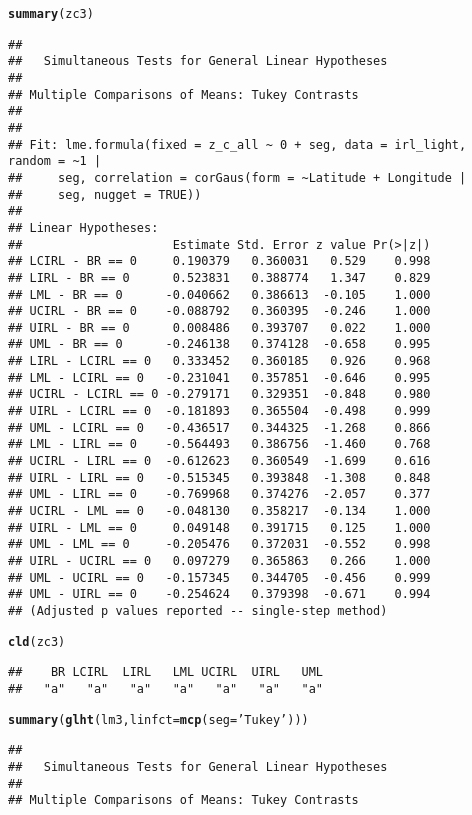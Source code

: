 \documentclass[letterpaper,12pt]{article}\usepackage[]{graphicx}\usepackage[]{color}
\makeatletter
\newcommand{\hlstr}[1]{\textcolor[rgb]{0.192,0.494,0.8}{#1}}%
\newcommand{\hlstd}[1]{\textcolor[rgb]{0.345,0.345,0.345}{#1}}%
\newcommand{\hlkwc}[1]{\textcolor[rgb]{0.333,0.667,0.333}{#1}}%
\newcommand{\hlkwd}[1]{\textcolor[rgb]{0.737,0.353,0.396}{\textbf{#1}}}%
\newenvironment{kframe}{%
 \def\at@end@of@kframe{}%
 \ifinner\ifhmode%
  \def\at@end@of@kframe{\end{minipage}}%
  \begin{minipage}{\columnwidth}%
 \fi\fi%
 \def\FrameCommand##1{\hskip\@totalleftmargin \hskip-\fboxsep
 \colorbox{shadecolor}{##1}\hskip-\fboxsep
     \hskip-\linewidth \hskip-\@totalleftmargin \hskip\columnwidth}%
 \MakeFramed {\advance\hsize-\width
   \@totalleftmargin\z@ \linewidth\hsize
   \@setminipage}}%
 {\par\unskip\endMakeFramed%
 \at@end@of@kframe}
\newenvironment{knitrout}{}{} %
\makeatother
\begin{document}
\begin{knitrout}
\begin{kframe}
\begin{alltt}
\hlkwd{summary}\hlstd{(zc3)}
\end{alltt}
\begin{verbatim}
## 
## 	 Simultaneous Tests for General Linear Hypotheses
## 
## Multiple Comparisons of Means: Tukey Contrasts
## 
## 
## Fit: lme.formula(fixed = z_c_all ~ 0 + seg, data = irl_light, random = ~1 | 
##     seg, correlation = corGaus(form = ~Latitude + Longitude | 
##     seg, nugget = TRUE))
## 
## Linear Hypotheses:
##                     Estimate Std. Error z value Pr(>|z|)
## LCIRL - BR == 0     0.190379   0.360031   0.529    0.998
## LIRL - BR == 0      0.523831   0.388774   1.347    0.829
## LML - BR == 0      -0.040662   0.386613  -0.105    1.000
## UCIRL - BR == 0    -0.088792   0.360395  -0.246    1.000
## UIRL - BR == 0      0.008486   0.393707   0.022    1.000
## UML - BR == 0      -0.246138   0.374128  -0.658    0.995
## LIRL - LCIRL == 0   0.333452   0.360185   0.926    0.968
## LML - LCIRL == 0   -0.231041   0.357851  -0.646    0.995
## UCIRL - LCIRL == 0 -0.279171   0.329351  -0.848    0.980
## UIRL - LCIRL == 0  -0.181893   0.365504  -0.498    0.999
## UML - LCIRL == 0   -0.436517   0.344325  -1.268    0.866
## LML - LIRL == 0    -0.564493   0.386756  -1.460    0.768
## UCIRL - LIRL == 0  -0.612623   0.360549  -1.699    0.616
## UIRL - LIRL == 0   -0.515345   0.393848  -1.308    0.848
## UML - LIRL == 0    -0.769968   0.374276  -2.057    0.377
## UCIRL - LML == 0   -0.048130   0.358217  -0.134    1.000
## UIRL - LML == 0     0.049148   0.391715   0.125    1.000
## UML - LML == 0     -0.205476   0.372031  -0.552    0.998
## UIRL - UCIRL == 0   0.097279   0.365863   0.266    1.000
## UML - UCIRL == 0   -0.157345   0.344705  -0.456    0.999
## UML - UIRL == 0    -0.254624   0.379398  -0.671    0.994
## (Adjusted p values reported -- single-step method)
\end{verbatim}
\begin{alltt}
\hlkwd{cld}\hlstd{(zc3)}
\end{alltt}
\begin{verbatim}
##    BR LCIRL  LIRL   LML UCIRL  UIRL   UML 
##   "a"   "a"   "a"   "a"   "a"   "a"   "a"
\end{verbatim}
\begin{alltt}
\hlkwd{summary}\hlstd{(}\hlkwd{glht}\hlstd{(lm3,} \hlkwc{linfct} \hlstd{=} \hlkwd{mcp}\hlstd{(}\hlkwc{seg} \hlstd{=} \hlstr{'Tukey'}\hlstd{)))}
\end{alltt}
\begin{verbatim}
## 
## 	 Simultaneous Tests for General Linear Hypotheses
## 
## Multiple Comparisons of Means: Tukey Contrasts

\end{verbatim}
\end{kframe}
\end{knitrout}
\end{document}
